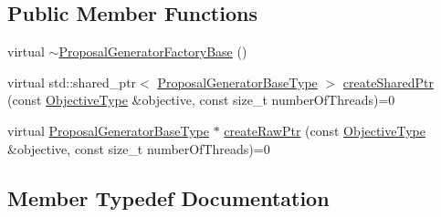 \subsection*{Public Member Functions}
\begin{DoxyCompactItemize}
\item 
virtual \hyperlink{classnifty_1_1graph_1_1optimization_1_1common_1_1ProposalGeneratorFactoryBase_af29d342021dcf7dc7f8280aa4a2a9ea9}{$\sim$\+Proposal\+Generator\+Factory\+Base} ()
\item 
virtual std\+::shared\+\_\+ptr$<$ \hyperlink{classnifty_1_1graph_1_1optimization_1_1common_1_1ProposalGeneratorFactoryBase_ac2be47e9c7b7a249b3d597831c50405d}{Proposal\+Generator\+Base\+Type} $>$ \hyperlink{classnifty_1_1graph_1_1optimization_1_1common_1_1ProposalGeneratorFactoryBase_a897b36881ba32ea9dd999d8626e4c15e}{create\+Shared\+Ptr} (const \hyperlink{classnifty_1_1graph_1_1optimization_1_1common_1_1ProposalGeneratorFactoryBase_aa5736d89b93a428099cc2f867266c8c7}{Objective\+Type} \&objective, const size\+\_\+t number\+Of\+Threads)=0
\item 
virtual \hyperlink{classnifty_1_1graph_1_1optimization_1_1common_1_1ProposalGeneratorFactoryBase_ac2be47e9c7b7a249b3d597831c50405d}{Proposal\+Generator\+Base\+Type} $\ast$ \hyperlink{classnifty_1_1graph_1_1optimization_1_1common_1_1ProposalGeneratorFactoryBase_ae49f77598c7e691d78cdf50fc0bbe459}{create\+Raw\+Ptr} (const \hyperlink{classnifty_1_1graph_1_1optimization_1_1common_1_1ProposalGeneratorFactoryBase_aa5736d89b93a428099cc2f867266c8c7}{Objective\+Type} \&objective, const size\+\_\+t number\+Of\+Threads)=0
\end{DoxyCompactItemize}


\subsection{Member Typedef Documentation}
\hypertarget{classnifty_1_1graph_1_1optimization_1_1common_1_1ProposalGeneratorFactoryBase_afbc5ea0723729b327417d43729cdf084}{}
